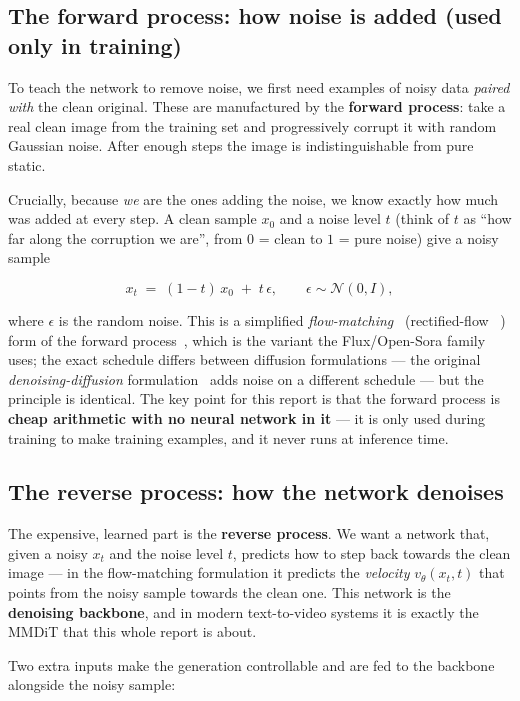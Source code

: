 \documentclass[11pt]{report}
\begin{document}
\subsection{The forward process: how noise is added (used only in training)}

To teach the network to remove noise, we first need examples of noisy
data \emph{paired with} the clean original. These are manufactured by the
\textbf{forward process}: take a real clean image from the training set
and progressively corrupt it with random Gaussian noise. After enough
steps the image is indistinguishable from pure static.

Crucially, because \emph{we} are the ones adding the noise, we know
exactly how much was added at every step. A clean sample $x_0$ and a noise
level $t$ (think of $t$ as ``how far along the corruption we are'', from
$0$ = clean to $1$ = pure noise) give a noisy sample

\[
x_t \;=\; (1-t)\,x_0 \;+\; t\,\epsilon,
\qquad \epsilon \sim \mathcal{N}(0, I),
\]

where $\epsilon$ is the random noise. This is a simplified
\emph{flow-matching}~\cite{lipman2023flowmatching} (rectified-flow~%
\cite{liu2023rectifiedflow}) form of the forward
process~\cite{esser2024sd3}, which is the variant the Flux/Open-Sora family
uses; the exact schedule differs between diffusion formulations --- the
original \emph{denoising-diffusion} formulation~\cite{ho2020ddpm} adds noise
on a different schedule --- but the principle is identical. The key point for
this report is that the forward process is \textbf{cheap arithmetic with
no neural network in it} --- it is only used during training to make
training examples, and it never runs at inference time.

\subsection{The reverse process: how the network denoises}

The expensive, learned part is the \textbf{reverse process}. We want a
network that, given a noisy $x_t$ and the noise level $t$, predicts how to
step back towards the clean image --- in the flow-matching formulation it
predicts the \emph{velocity} $v_\theta(x_t, t)$ that points from the noisy
sample towards the clean one. This network is the \textbf{denoising
backbone}, and in modern text-to-video systems it is exactly the MMDiT
that this whole report is about.

Two extra inputs make the generation controllable and are fed to the
backbone alongside the noisy sample:
\end{document}
